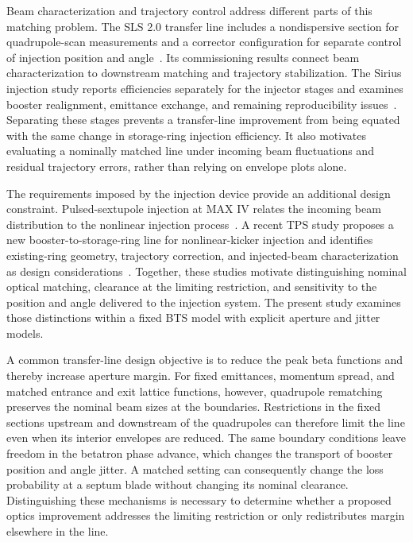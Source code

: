 \documentclass[final,5p,twocolumn]{elsarticle}
\begin{document}
Beam characterization and trajectory control address different parts of this
matching problem. The SLS 2.0 transfer line includes a nondispersive section for
quadrupole-scan measurements and a corrector configuration for separate control
of injection position and angle~\cite{Kallestrup2025}. Its commissioning results
connect beam characterization to downstream matching and trajectory
stabilization. The Sirius injection study reports efficiencies separately for
the injector stages and examines booster realignment, emittance exchange, and
remaining reproducibility issues~\cite{Resende2022}. Separating these stages
prevents a transfer-line improvement from being equated with the same change in
storage-ring injection efficiency. It also motivates evaluating a nominally
matched line under incoming beam fluctuations and residual trajectory errors,
rather than relying on envelope plots alone.

The requirements imposed by the injection device provide an additional design
constraint. Pulsed-sextupole injection at MAX IV relates the incoming beam
distribution to the nonlinear injection process~\cite{Leemann2012}. A recent TPS
study proposes a new booster-to-storage-ring line for
nonlinear-kicker injection and identifies existing-ring geometry, trajectory
correction, and injected-beam characterization as design
considerations~\cite{Luo2026}. Together, these studies motivate distinguishing
nominal optical matching, clearance at the limiting restriction, and sensitivity
to the position and angle delivered to the injection system. The present study
examines those distinctions within a fixed BTS model with explicit aperture
and jitter models.

A common transfer-line design objective is to reduce the peak beta functions
and thereby increase aperture margin. For fixed emittances, momentum spread,
and matched entrance and exit lattice functions, however, quadrupole rematching
preserves the nominal beam sizes at the boundaries. Restrictions in the fixed
sections upstream and downstream of the quadrupoles can therefore limit the line
even when its interior envelopes are reduced. The same boundary conditions leave
freedom in the betatron phase advance, which changes the transport of booster
position and angle jitter. A matched setting can consequently change the loss
probability at a septum blade without changing its nominal clearance.
Distinguishing these mechanisms is necessary to determine whether a proposed
optics improvement addresses the limiting restriction or only redistributes
margin elsewhere in the line.
\end{document}

